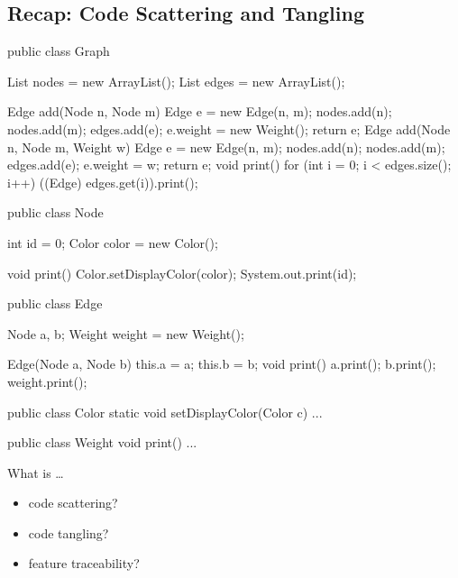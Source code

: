 \subsection{Recap: Code Scattering and Tangling}
\begin{frame}[fragile]{\myframetitle}
	\small\begin{mycolumns}[columns=3,T,animation=none,widths={43,32}]
\begin{codetight}{}
public class Graph {
	List nodes = new ArrayList();
	List edges = new ArrayList();

	Edge add(Node n, Node m) {
		Edge e = new Edge(n, m);
		nodes.add(n); nodes.add(m); edges.add(e);
		e.weight = new Weight();
		return e;
	}
	Edge add(Node n, Node m, Weight w) {
		Edge e = new Edge(n, m);
		nodes.add(n); nodes.add(m); edges.add(e);
		e.weight = w;
		return e;
	}
	void print() {
		for (int i = 0; i < edges.size(); i++) {
			((Edge) edges.get(i)).print();
		}
	}
}
\end{codetight}
		\mynextcolumn
\begin{codetight}{}
public class Node {
	int id = 0;
	Color color = new Color();

	void print() {
		Color.setDisplayColor(color);
		System.out.print(id);
	}
}
\end{codetight}
\begin{codetight}{}
public class Edge {
	Node a, b;
	Weight weight = new Weight();

	Edge(Node a, Node b) {
		this.a = a; this.b = b;
	}
	void print() {
		a.print(); b.print();
		weight.print();
	}
}
\end{codetight}
		\mynextcolumn
\begin{codetight}{}
public class Color {
	static void setDisplayColor(Color c) {...}
}
\end{codetight}	
\begin{codetight}{}
public class Weight {
	void print() {...}
}
\end{codetight}
		\hspace{10mm}
		\begin{note}{What is \ldots}
			\setlength\leftmargini{3mm}
			\begin{itemize}
				\item<+-> code scattering? 
				\item<+-> code tangling? 
				\item<+-> feature traceability? 
			\end{itemize}
		\end{note}
	\end{mycolumns}
\end{frame}

